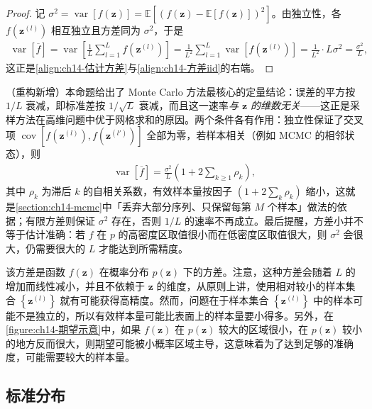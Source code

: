 \documentclass[../../main.tex]{subfiles}
\begin{document}
\begin{proof}
记 $\sigma^{2}=\operatorname{var}[f(\bm{z})]=\mathbb{E}\left[\left(f(\bm{z})-\mathbb{E}[f(\bm{z})]\right)^{2}\right]$。由独立性，各 $f(\bm{z}^{(l)})$ 相互独立且方差同为 $\sigma^{2}$，于是
\begin{align*}
\operatorname{var}\left[\overline{f}\right]=\operatorname{var}\left[\frac{1}{L}\sum_{l=1}^{L}f\!\left(\bm{z}^{(l)}\right)\right]=\frac{1}{L^{2}}\sum_{l=1}^{L}\operatorname{var}\left[f\!\left(\bm{z}^{(l)}\right)\right]=\frac{1}{L^{2}}\cdot L\sigma^{2}=\frac{\sigma^{2}}{L},
\end{align*}
这正是\eqref{align:ch14-估计方差}与\eqref{align:ch14-方差iid}的右端。
\end{proof}

\begin{remark}（重构新增）本命题给出了 Monte Carlo 方法最核心的定量结论：误差的平方按 $1/L$ 衰减，即标准差按 $1/\sqrt{L}$ 衰减，而且这一速率\emph{与 $\bm{z}$ 的维数无关}——这正是采样方法在高维问题中优于网格求和的原因。两个条件各有作用：独立性保证了交叉项 $\operatorname{cov}[f(\bm{z}^{(l)}),f(\bm{z}^{(l')})]$ 全部为零，若样本相关（例如 MCMC 的相邻状态），则
\begin{align*}
\operatorname{var}\left[\overline{f}\right]=\frac{\sigma^{2}}{L}\left(1+2\sum_{k\geqslant1}\rho_k\right),
\end{align*}
其中 $\rho_k$ 为滞后 $k$ 的自相关系数，有效样本量按因子 $\left(1+2\sum_k\rho_k\right)$ 缩小，这就是\cref{section:ch14-mcmc}中「丢弃大部分序列、只保留每第 $M$ 个样本」做法的依据；有限方差则保证 $\sigma^{2}$ 存在，否则 $1/L$ 的速率不再成立。最后提醒，方差小并不等于估计准确：若 $f$ 在 $p$ 的高密度区取值很小而在低密度区取值很大，则 $\sigma^{2}$ 会很大，仍需要很大的 $L$ 才能达到所需精度。
\end{remark}

该方差是函数 $f(\bm{z})$ 在概率分布 $p(\bm{z})$ 下的方差。注意，这种方差会随着 $L$ 的增加而线性减小，并且不依赖于 $\bm{z}$ 的维度，从原则上讲，使用相对较小的样本集合 $\left\{\bm{z}^{(l)}\right\}$ 就有可能获得高精度。然而，问题在于样本集合 $\left\{\bm{z}^{(l)}\right\}$ 中的样本可能不是独立的，所以有效样本量可能比表面上的样本量要小得多。另外，在\cref{figure:ch14-期望示意}中，如果 $f(\bm{z})$ 在 $p(\bm{z})$ 较大的区域很小，在 $p(\bm{z})$ 较小的地方反而很大，则期望可能被小概率区域主导，这意味着为了达到足够的准确度，可能需要较大的样本量。

\subsection{标准分布}\label{subsection:ch14-标准分布}
\end{document}
